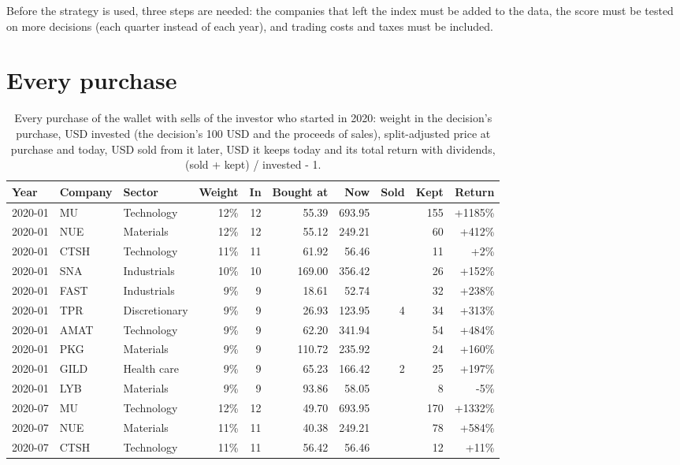 \documentclass[11pt,a4paper]{article}
\begin{document}
Before the strategy is used, three steps are needed: the companies that left the index must be added to the data, the score must be tested on more decisions (each quarter instead of each year), and trading costs and taxes must be included.

\newpage
\appendix
\section{Every purchase}
\label{app:purchases}
{\small
\begin{longtable}{l l l r r r r r r r}
\caption{Every purchase of the wallet with sells of the investor who started in 2020: weight in the decision's purchase, USD invested (the decision's 100 USD and the proceeds of sales), split-adjusted price at purchase and today, USD sold from it later, USD it keeps today and its total return with dividends, (sold + kept) / invested - 1.}\label{tab:purchases}\\
\hline
Year & Company & Sector & Weight & In & Bought at & Now & Sold & Kept & Return \\
\hline
\endhead
2020-01 & MU & Technology & 12\% & 12 & 55.39 & 693.95 &  & 155 & +1185\% \\
2020-01 & NUE & Materials & 12\% & 12 & 55.12 & 249.21 &  & 60 & +412\% \\
2020-01 & CTSH & Technology & 11\% & 11 & 61.92 & 56.46 &  & 11 & +2\% \\
2020-01 & SNA & Industrials & 10\% & 10 & 169.00 & 356.42 &  & 26 & +152\% \\
2020-01 & FAST & Industrials & 9\% & 9 & 18.61 & 52.74 &  & 32 & +238\% \\
2020-01 & TPR & Discretionary & 9\% & 9 & 26.93 & 123.95 & 4 & 34 & +313\% \\
2020-01 & AMAT & Technology & 9\% & 9 & 62.20 & 341.94 &  & 54 & +484\% \\
2020-01 & PKG & Materials & 9\% & 9 & 110.72 & 235.92 &  & 24 & +160\% \\
2020-01 & GILD & Health care & 9\% & 9 & 65.23 & 166.42 & 2 & 25 & +197\% \\
2020-01 & LYB & Materials & 9\% & 9 & 93.86 & 58.05 &  & 8 & -5\% \\
2020-07 & MU & Technology & 12\% & 12 & 49.70 & 693.95 &  & 170 & +1332\% \\
2020-07 & NUE & Materials & 11\% & 11 & 40.38 & 249.21 &  & 78 & +584\% \\
2020-07 & CTSH & Technology & 11\% & 11 & 56.42 & 56.46 &  & 12 & +11\% \\

\end{longtable}}
\end{document}
